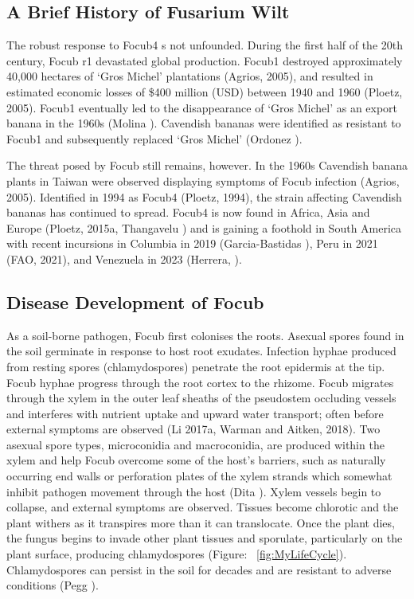 \subsection{A Brief History of Fusarium Wilt}

The robust response to \ac{Focub4} s not unfounded. During the first half of the 20th century, \acs{Focub} \ac{r1} devastated global production. \acs{Focub1} destroyed approximately 40,000 hectares of ‘Gros Michel’ plantations (Agrios, 2005), and resulted in estimated economic losses of \$400 million (USD) between 1940 and 1960 (Ploetz, 2005). \ac{Focub1} eventually led to the disappearance of ‘Gros Michel’ as an export banana in the 1960s (Molina ). Cavendish bananas were identified as resistant to \ac{Focub1} and subsequently replaced ‘Gros Michel’ (Ordonez ). 

The threat posed by \ac{Focub} still remains, however. In the 1960s Cavendish banana plants in Taiwan were observed displaying symptoms of \ac{Focub} infection (Agrios, 2005). Identified in 1994 as \acl{Focub4} (Ploetz, 1994), the strain affecting Cavendish bananas has continued to spread. \Ac{Focub4} is now found in Africa, Asia and Europe (Ploetz, 2015a, Thangavelu ) and is gaining a foothold in South America with recent incursions in Columbia in 2019 (Garcia-Bastidas ), Peru in 2021 (\ac{FAO}, 2021), and Venezuela in 2023 (Herrera, ).

\subsection{Disease Development of \acl{Focub}}

As a soil-borne pathogen, \ac{Focub} first colonises the roots. Asexual spores found in the soil germinate in response to host root exudates. Infection hyphae produced from resting spores (chlamydospores) penetrate the root epidermis at the tip. \ac{Focub} hyphae progress through the root cortex to the rhizome. \ac{Focub} migrates through the xylem in the outer leaf sheaths of the pseudostem occluding vessels and interferes with nutrient uptake and upward water transport; often before external symptoms are observed (Li \et 2017a, Warman and Aitken, 2018). Two asexual spore types, microconidia and macroconidia, are produced within the xylem and help \ac{Focub} overcome some of the host’s barriers, such as naturally occurring end walls or perforation plates of the xylem strands which somewhat inhibit pathogen movement through the host (Dita ). Xylem vessels begin to collapse, and external symptoms are observed. Tissues become chlorotic and the plant withers as it transpires more than it can translocate. Once the plant dies, the fungus begins to invade other plant tissues and sporulate, particularly on the plant surface, producing chlamydospores (Figure: ~\ref{fig:MyLifeCycle}). Chlamydospores can persist in the soil for decades and are resistant to adverse conditions (Pegg ).  

